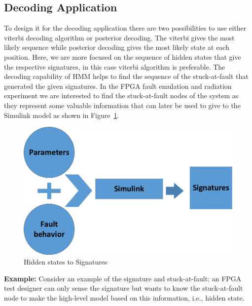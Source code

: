 \subsection{Decoding Application}







To design it for the decoding application there are two possibilities to use either viterbi decoding algorithm or posterior decoding. The viterbi gives the most likely sequence while posterior decoding gives the most likely state at each position. Here, we are more focused on the sequence of hidden states that give the respective signatures, in this case viterbi algorithm is preferable. The decoding capability of HMM helps to find the sequence of the stuck-at-fault that generated the given signatures. In the FPGA fault emulation and radiation experiment we are interested to find the stuck-at-fault nodes of the system as they represent some valuable information that can later be used to give to the Simulink model as shown in Figure~\ref{fig:HMMsig}.



\begin{figure}[tb!]

 \centering
  \captionsetup{justification=centering}    
   \includegraphics[scale=0.8]{Figures/fromhiddentosignature.pdf}
   \caption{Hidden states to Signatures}
\label{fig:HMMsig}
\end{figure}



 
\textbf{Example:} Consider an example of the signature and stuck-at-fault; an FPGA test designer can only sense the signature but wants to know the stuck-at-fault node to make the high-level model based on this information, i.e., hidden state. 

